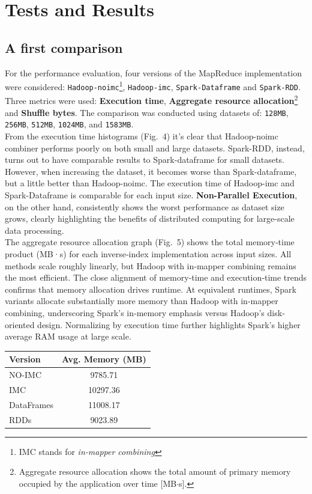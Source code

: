 \section{Tests and Results}

\subsection{A first comparison}
For the performance evaluation, four versions of the MapReduce implementation were considered: 
\texttt{Hadoop-noimc}\footnote{IMC stands for \textit{in-mapper combining}}, 
\texttt{Hadoop-imc}, \texttt{Spark-Dataframe} and \texttt{Spark-RDD}. Three metrics were used: \textbf{Execution time}, \textbf{Aggregate resource allocation}\footnote{Aggregate resource allocation shows the total amount of primary memory occupied by the application over time [MB$\cdot$s].} and \textbf{Shuffle bytes}. The comparison was conducted using datasets of: 
\texttt{128MB}, \texttt{256MB}, \texttt{512MB}, \texttt{1024MB}, and \texttt{1583MB}.\\
From the execution time histograms (Fig.~4) it's clear that Hadoop-noimc combiner performs poorly on both small and large datasets. Spark-RDD, instead, turns out to have comparable results to Spark-dataframe for small datasets. However, when increasing the dataset, it becomes worse than Spark-dataframe, but a little better than Hadoop-noimc. The execution time of Hadoop-imc and Spark-Dataframe is comparable for each input size. \textbf{Non-Parallel Execution}, on the other hand, consistently shows the worst performance as dataset size grows, clearly highlighting the benefits of distributed computing for large-scale data processing.\\
The aggregate resource allocation graph (Fig.~5) shows the total memory‐time product (MB·s) for each inverse‐index implementation across input sizes. All methods scale roughly linearly, but Hadoop with in‐mapper combining remains the most efficient. The close alignment of memory‐time and execution‐time trends confirms that memory allocation drives runtime. At equivalent runtimes, Spark variants allocate substantially more memory than Hadoop with in‐mapper combining, underscoring Spark's in‐memory emphasis versus Hadoop's disk‐oriented design. Normalizing by execution time further highlights Spark’s higher average RAM usage at large scale. 
\begin{table}[H]
	\centering
	\begin{tabular}{lc}
		\hline
		\textbf{Version} & \textbf{Avg. Memory (MB)} \\
		\hline
		NO-IMC    & 9785.71 \\
		IMC  & 10297.36 \\
		DataFrames & 11008.17 \\
		RDDs       & 9023.89 \\
		\hline
	\end{tabular}
	\label{tab:avg-mem}
\end{table}
